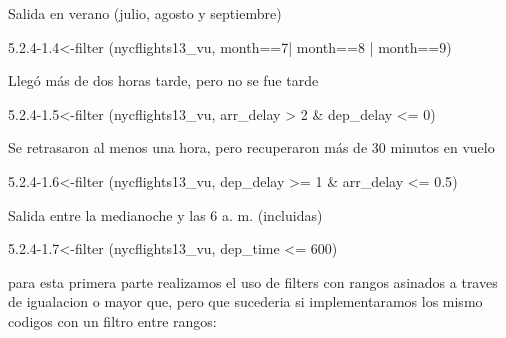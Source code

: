 \documentclass[
]{article}
\newenvironment{Shaded}{\begin{snugshade}}{\end{snugshade}}
\newcommand{\DecValTok}[1]{\textcolor[rgb]{0.00,0.00,0.81}{#1}}
\newcommand{\FloatTok}[1]{\textcolor[rgb]{0.00,0.00,0.81}{#1}}
\newcommand{\FunctionTok}[1]{\textcolor[rgb]{0.00,0.00,0.00}{#1}}
\newcommand{\NormalTok}[1]{#1}
\newcommand{\OtherTok}[1]{\textcolor[rgb]{0.56,0.35,0.01}{#1}}
\newcommand{\SpecialCharTok}[1]{\textcolor[rgb]{0.00,0.00,0.00}{#1}}
\newcommand{\StringTok}[1]{\textcolor[rgb]{0.31,0.60,0.02}{#1}}
\begin{document}
Salida en verano (julio, agosto y septiembre)

\begin{Shaded}
\begin{Highlighting}[]
\StringTok{\textquotesingle{}5.2.4{-}1.4\textquotesingle{}}\OtherTok{\textless{}{-}}\FunctionTok{filter}\NormalTok{ (nycflights13\_vu, month}\SpecialCharTok{==}\DecValTok{7}\SpecialCharTok{|}\NormalTok{ month}\SpecialCharTok{==}\DecValTok{8} \SpecialCharTok{|}\NormalTok{ month}\SpecialCharTok{==}\DecValTok{9}\NormalTok{) }
\end{Highlighting}
\end{Shaded}

Llegó más de dos horas tarde, pero no se fue tarde

\begin{Shaded}
\begin{Highlighting}[]
\StringTok{\textquotesingle{}5.2.4{-}1.5\textquotesingle{}}\OtherTok{\textless{}{-}}\FunctionTok{filter}\NormalTok{ (nycflights13\_vu, arr\_delay }\SpecialCharTok{\textgreater{}} \DecValTok{2} \SpecialCharTok{\&}\NormalTok{ dep\_delay }\SpecialCharTok{\textless{}=} \DecValTok{0}\NormalTok{)}
\end{Highlighting}
\end{Shaded}

Se retrasaron al menos una hora, pero recuperaron más de 30 minutos en
vuelo

\begin{Shaded}
\begin{Highlighting}[]
\StringTok{\textquotesingle{}5.2.4{-}1.6\textquotesingle{}}\OtherTok{\textless{}{-}}\FunctionTok{filter}\NormalTok{ (nycflights13\_vu, dep\_delay }\SpecialCharTok{\textgreater{}=} \DecValTok{1} \SpecialCharTok{\&}\NormalTok{ arr\_delay }\SpecialCharTok{\textless{}=} \FloatTok{0.5}\NormalTok{)}
\end{Highlighting}
\end{Shaded}

Salida entre la medianoche y las 6 a. m. (incluidas)

\begin{Shaded}
\begin{Highlighting}[]
\StringTok{\textquotesingle{}5.2.4{-}1.7\textquotesingle{}}\OtherTok{\textless{}{-}}\FunctionTok{filter}\NormalTok{ (nycflights13\_vu, dep\_time }\SpecialCharTok{\textless{}=} \DecValTok{600}\NormalTok{)}
\end{Highlighting}
\end{Shaded}

para esta primera parte realizamos el uso de filters con rangos asinados
a traves de igualacion o mayor que, pero que sucederia si
implementaramos los mismo codigos con un filtro entre rangos:
\end{document}
